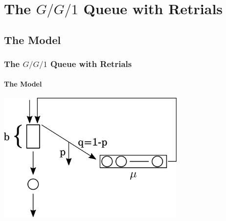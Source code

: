 \documentclass{beamer}
\begin{document}




\section{The $G/G/1$ Queue with Retrials}

\subsection{The Model}



\begin{frame}
  \frametitle{The $G/G/1$ Queue with Retrials}
  \framesubtitle{The Model}
  \begin{center}
    \includegraphics[width=0.7\textwidth]{pictures/p25.pdf}
  \end{center}
\end{frame}
\end{document}
